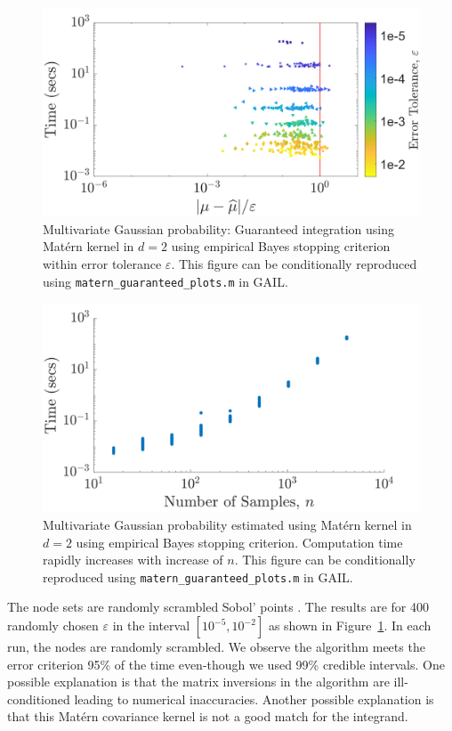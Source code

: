 \documentclass{iitthesis}          %
\newcommand{\code}[1]{\texttt{#1}}
\newcommand\figref{Figure~\ref}
\begin{document}
\begin{figure}[h]
	\centering
	\includegraphics[width=0.9\linewidth]{MVN_guaranteed_time_Matern_d2_2019-Jun-29}
	\caption{Multivariate Gaussian probability: Guaranteed integration using Mat\'ern kernel in $d=2$ using empirical Bayes stopping criterion within error tolerance $\varepsilon$. This figure can be conditionally reproduced using \code{matern\_guaranteed\_plots.m} in GAIL.}
	\label{fig:MVN_Metern_d2b2}
\end{figure}
\begin{figure}[h]
	\centering
	\includegraphics[width=0.9\linewidth]{MVN_rapid_n_vs_time_Matern_d2_2019-Jun-29}
	\caption{Multivariate Gaussian probability estimated using Mat\'ern kernel in $d=2$ using empirical Bayes stopping criterion. Computation time rapidly increases with increase of $n$. This figure can be conditionally reproduced using \code{matern\_guaranteed\_plots.m} in GAIL.}
	\label{fig:MVN_Metern_d2b2_time_growth}
\end{figure}
The node sets are randomly scrambled Sobol' points \cite{DicEtal14a,DicPil10a}.  The results are for 400 randomly chosen $\varepsilon$ in the interval $[10^{-5}, 10^{-2}]$ as shown in \figref{fig:MVN_Metern_d2b2}. In each run, the nodes are randomly scrambled.  We  observe the algorithm meets the error criterion 95\% of the time even-though we used 99\% credible intervals.
One possible explanation is that the matrix inversions in the algorithm are ill-conditioned leading to numerical inaccuracies.  Another possible explanation is that this Mat\'ern covariance kernel is not a good match for the integrand.
\end{document}
